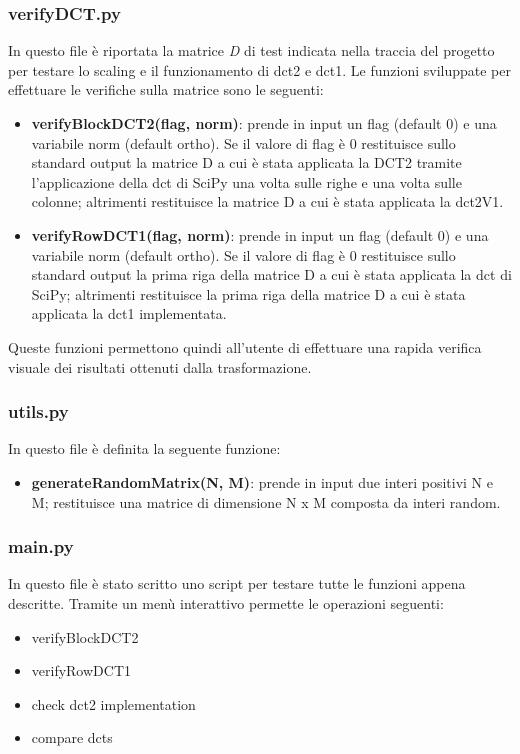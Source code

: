 \subsubsection{verifyDCT.py}
In questo file è riportata la matrice \textit{D} di test indicata nella traccia del progetto per testare lo scaling e il funzionamento di dct2 e dct1.
Le funzioni sviluppate per effettuare le verifiche sulla matrice sono le seguenti:
\begin{itemize}
\item \textbf{verifyBlockDCT2(flag, norm)}: prende in input un flag (default 0) e una variabile norm (default ortho).
Se il valore di flag è 0 restituisce sullo standard output la matrice D a cui è stata applicata la DCT2 tramite l'applicazione della dct di SciPy una volta sulle righe e una volta sulle colonne; altrimenti restituisce la matrice D a cui è stata applicata la dct2V1.
\item \textbf{verifyRowDCT1(flag, norm)}: prende in input un flag (default 0) e una variabile norm (default ortho).
Se il valore di flag è 0 restituisce sullo standard output la prima riga della matrice D a cui è stata applicata la dct di SciPy; altrimenti restituisce la prima riga della matrice D a cui è stata applicata la dct1 implementata.
\end{itemize}
Queste funzioni permettono quindi all'utente di effettuare una rapida verifica visuale dei risultati ottenuti dalla trasformazione.

\subsubsection{utils.py}
In questo file è definita la seguente funzione:
\begin{itemize}

\item
\textbf{generateRandomMatrix(N, M)}: prende in input due interi positivi N e M; restituisce una matrice di dimensione N x M composta da interi random.
\end{itemize}

\subsubsection{main.py}
In questo file è stato scritto uno script per testare tutte le funzioni appena descritte.
Tramite un menù interattivo permette le operazioni seguenti:
\begin{itemize}
    \item verifyBlockDCT2
    \item verifyRowDCT1
    \item check dct2 implementation
    \item compare dcts
\end{itemize}

